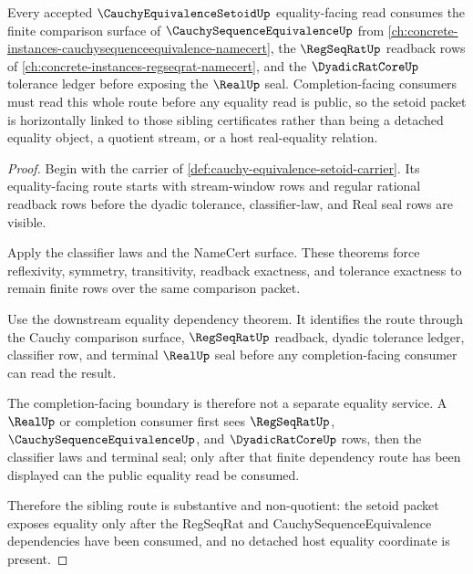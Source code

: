 \begin{theorem}
\label{thm:cauchy-equivalence-setoid-regseqrat-sibling-route}
Every accepted $\CauchyEquivalenceSetoidUp$ equality-facing read consumes the finite comparison surface of $\CauchySequenceEquivalenceUp$ from \autoref{ch:concrete-instances-cauchysequenceequivalence-namecert}, the $\RegSeqRatUp$ readback rows of \autoref{ch:concrete-instances-regseqrat-namecert}, and the $\DyadicRatCoreUp$ tolerance ledger before exposing the $\RealUp$ seal. Completion-facing consumers must read this whole route before any equality read is public, so the setoid packet is horizontally linked to those sibling certificates rather than being a detached equality object, a quotient stream, or a host real-equality relation.
\end{theorem}
\begin{proof}
Begin with the carrier of \autoref{def:cauchy-equivalence-setoid-carrier}. Its equality-facing route starts with stream-window rows and regular rational readback rows before the dyadic tolerance, classifier-law, and Real seal rows are visible.

Apply the classifier laws and the NameCert surface. These theorems force reflexivity, symmetry, transitivity, readback exactness, and tolerance exactness to remain finite rows over the same comparison packet.

Use the downstream equality dependency theorem. It identifies the route through the Cauchy comparison surface, $\RegSeqRatUp$ readback, dyadic tolerance ledger, classifier row, and terminal $\RealUp$ seal before any completion-facing consumer can read the result.

The completion-facing boundary is therefore not a separate equality service. A $\RealUp$ or completion consumer first sees $\RegSeqRatUp$, $\CauchySequenceEquivalenceUp$, and $\DyadicRatCoreUp$ rows, then the classifier laws and terminal seal; only after that finite dependency route has been displayed can the public equality read be consumed.

Therefore the sibling route is substantive and non-quotient: the setoid packet exposes equality only after the RegSeqRat and CauchySequenceEquivalence dependencies have been consumed, and no detached host equality coordinate is present.
\end{proof}
